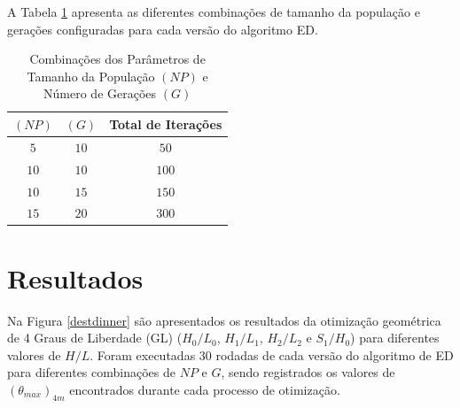 \documentclass[12pt,A4,A4pt]{article}
\begin{document}
A Tabela \ref{tab:popgeracao} apresenta as diferentes combinações de tamanho da população e gerações configuradas para cada versão do algoritmo ED.

\begin{table}[htbp]
\small
\centering
\caption{\small Combinações dos Parâmetros de Tamanho da População $(NP)$ e Número de Gerações $(G)$}
\begin{tabular}{ccc}
\hline
$(NP)$ & $(G)$ & Total de Iterações \\
\hline
$5$ & $10$ & $50$	\\
$10$ & $10$ & $100$	\\
$10$ & $15$ & $150$	\\
$15$ & $20$ & $300$	\\
\hline
\end{tabular}
  \label{tab:popgeracao}
\end{table}

\section{Resultados}
\label{opt}
\hspace{0.5cm}Na Figura \ref{destdinner} são apresentados os resultados da otimização geométrica de 4 Graus de Liberdade (GL) ($H_{0}/L_{0}$, $H_{1}/L_{1}$, $H_{2}/L_{2}$ e $S_{1}/H_{0}$) para diferentes valores de $H/L$. Foram executadas 30 rodadas de cada versão do algoritmo de ED para diferentes combinações de $NP$ e $G$, sendo registrados os valores de $({\theta}_{max})_{4m}$ encontrados durante cada processo de otimização. 
\end{document}
